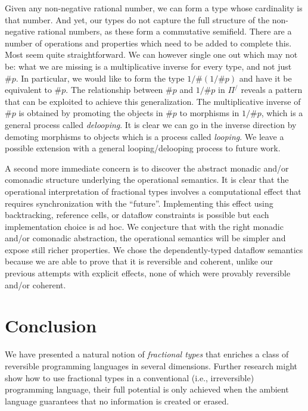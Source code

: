 \documentclass[a4paper,USenglish]{lipics-v2016-utf8x}
\newcommand{\hash}{\#}
\newcommand{\order}[1]{\hash #1}
\newcommand{\iorder}[1]{1/\hash #1}
\begin{document}
Given any non-negative rational number, we can form a type whose cardinality is
that number. And yet, our types do not capture the full structure of the
non-negative rational numbers, as these form a commutative semifield. There are
a number of operations and properties which need to be added to complete this.
Most seem quite straightforward.  We can however single one out which may not
be: what we are missing is a multiplicative inverse for every type, and not just
$\order{p}$. In particular, we would like to form the type
$\iorder{(\iorder{p})}$ and have it be equivalent to $\order{p}$.  The
relationship between $\order{p}$ and $\iorder{p}$ in $\Pi^/$ reveals a pattern
that can be exploited to achieve this generalization. The multiplicative inverse
of $\order{p}$ is obtained by promoting the objects in $\order{p}$ to morphisms
in $1/\hash p$, which is a general process called \emph{delooping}. It is clear
we can go in the inverse direction by demoting morphisms to objects which is a
process called \emph{looping}. We leave a possible extension with a general
looping/delooping process to future work.

A second more immediate concern is to discover the abstract monadic and/or
comonadic structure underlying the operational semantics. It is clear that the
operational interpretation of fractional types involves a computational effect
that requires synchronization with the ``future''. Implementing this effect
using backtracking, reference cells, or dataflow constraints is possible but
each implementation choice is ad hoc. We conjecture that with the right monadic
and/or comonadic abstraction, the operational semantics will be simpler and
expose still richer properties.  We chose the dependently-typed dataflow
semantics because we are able to prove that it is reversible and coherent,
unlike our previous attempts with explicit effects, none of which were provably
reversible and/or coherent.

\section{Conclusion}

We have presented a natural notion of \emph{fractional types} that
enriches a class of reversible programming languages in several
dimensions.  Further research might show how to use fractional
types in a conventional (i.e., irreversible) programming language, their full
potential is only achieved when the ambient language guarantees that
no information is created or erased.
\end{document}
